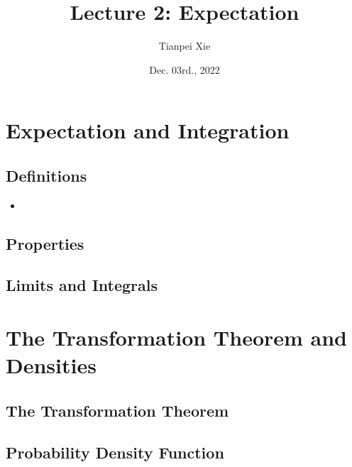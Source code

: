 \documentclass[11pt]{article}
\begin{document}
\title{Lecture 2: Expectation}
\author{ Tianpei Xie}
\date{ Dec. 03rd., 2022}
\maketitle
\tableofcontents
\newpage
\section{Expectation and Integration}
\subsection{Definitions}
\begin{itemize}
\item 
\end{itemize}

\subsection{Properties}

\subsection{Limits and Integrals}

\section{The Transformation Theorem and Densities}
\subsection{The Transformation Theorem}

\subsection{Probability Density Function}

\newpage


\end{document}
